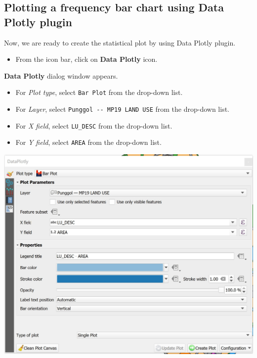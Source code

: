 \documentclass[
  letterpaper,
  DIV=11,
  numbers=noendperiod]{scrreprt}
\providecommand{\tightlist}{%
  \setlength{\itemsep}{0pt}\setlength{\parskip}{0pt}}\usepackage{longtable,booktabs,array}
\begin{document}
\hypertarget{plotting-a-frequency-bar-chart-using-data-plotly-plugin}{%
\subsection{\texorpdfstring{Plotting a frequency bar chart using
\textbf{Data Plotly}
plugin}{Plotting a frequency bar chart using Data Plotly plugin}}\label{plotting-a-frequency-bar-chart-using-data-plotly-plugin}}

Now, we are ready to create the statistical plot by using Data Plotly
plugin.

\begin{itemize}
\tightlist
\item
  From the icon bar, click on \textbf{Data Plotly} icon.
\end{itemize}

\textbf{Data Plotly} dialog window appears.

\begin{itemize}
\item
  For \emph{Plot type}, select \texttt{Bar\ Plot} from the drop-down
  list.
\item
  For \emph{Layer}, select \texttt{Punggol\ -\/-\ MP19\ LAND\ USE} from
  the drop-down list.
\item
  For \emph{X field}, select \texttt{LU\_DESC} from the drop-down list.
\item
  For \emph{Y field}, select \texttt{AREA} from the drop-down list.
\end{itemize}

\includegraphics{./img04/image40.jpg}
\end{document}
